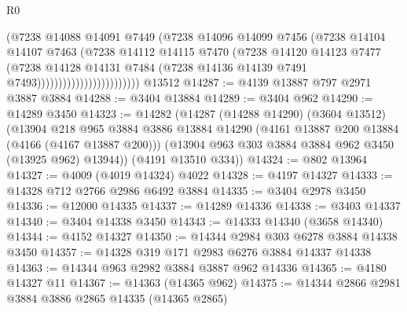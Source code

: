 \begin{lexlean}{R0}
\begin{coremodule}
                                      (@7238
                                        @14088
                                        @14091
                                        @7449
                                        (@7238
                                          @14096
                                          @14099
                                          @7456
                                          (@7238
                                            @14104
                                            @14107
                                            @7463
                                            (@7238
                                              @14112
                                              @14115
                                              @7470
                                              (@7238
                                                @14120
                                                @14123
                                                @7477
                                                (@7238
                                                  @14128
                                                  @14131
                                                  @7484
                                                  (@7238
                                                    @14136
                                                    @14139
                                                    @7491
                                                    @7493))))))))))))))))))))))))
    @13512
@14287 := @4139 @13887 @797 @2971 @3887 @3884
@14288 := @3404 @13884
@14289 := @3404 @962
@14290 := @14289 @3450
@14323 := @14282
    (@14287
      (@14288 @14290)
      (@3604 @13512)
      (@13904
        @218
        @965
        @3884
        @3886
        @13884
        @14290
        (@4161 @13887 @200 @13884 (@4166 (@4167 @13887 @200)))
        (@13904 @963 @303 @3884 @3884 @962 @3450 (@13925 @962) @13944))
      (@4191 @13510 @334))
@14324 := @802 @13964
@14327 := @4009 (@4019 @14324) @4022
@14328 := @4197 @14327
@14333 := @14328 @712 @2766 @2986 @6492 @3884
@14335 := @3404 @2978 @3450
@14336 := @12000 @14335
@14337 := @14289 @14336
@14338 := @3403 @14337
@14340 := @3404 @14338 @3450
@14343 := @14333 @14340 (@3658 @14340)
@14344 := @4152 @14327
@14350 := @14344 @2984 @303 @6278 @3884 @14338 @3450
@14357 := @14328 @319 @171 @2983 @6276 @3884 @14337 @14338
@14363 := @14344 @963 @2982 @3884 @3887 @962 @14336
@14365 := @4180 @14327 @11
@14367 := @14363 (@14365 @962)
@14375 := @14344 @2866 @2981 @3884 @3886 @2865 @14335 (@14365 @2865)

\end{coremodule}
\end{lexlean}
